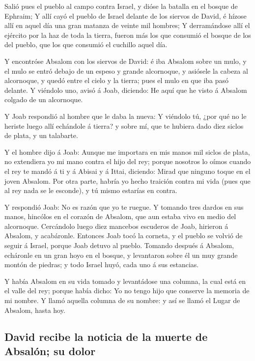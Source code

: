  Salió pues el pueblo al campo contra Israel, y dióse la
batalla en el bosque de Ephraim;  Y allí cayó el pueblo de
Israel delante de los siervos de David, é hízose allí en aquel día una
gran matanza de veinte mil hombres;  Y derramándose allí el
ejército por la haz de toda la tierra, fueron más los que consumió el
bosque de los del pueblo, que los que consumió el cuchillo aquel día.

 Y encontróse Absalom con los siervos de David: é iba
Absalom sobre un mulo, y el mulo se entró debajo de un espeso y grande
alcornoque, y asiósele la cabeza al alcornoque, y quedó entre el cielo y
la tierra; pues el mulo en que iba pasó delante.  Y
viéndolo uno, avisó á Joab, diciendo: He aquí que he visto á Absalom
colgado de un alcornoque.

 Y Joab respondió al hombre que le daba la nueva: Y
viéndolo tú, ¿por qué no le heriste luego allí echándole á tierra? y
sobre mí, que te hubiera dado diez siclos de plata, y un talabarte.

 Y el hombre dijo á Joab: Aunque me importara en mis manos
mil siclos de plata, no extendiera yo mi mano contra el hijo del rey;
porque nosotros lo oímos cuando el rey te mandó á ti y á Abisai y á
Ittai, diciendo: Mirad que ninguno toque en el joven Absalom.
 Por otra parte, habría yo hecho traición contra mi vida
(pues que al rey nada se le esconde), y tú mismo estarías en contra.

 Y respondió Joab: No es razón que yo te ruegue. Y tomando
tres dardos en sus manos, hincólos en el corazón de Absalom, que aun
estaba vivo en medio del alcornoque.  Cercándolo luego diez
mancebos escuderos de Joab, hirieron á Absalom, y acabáronle.
 Entonces Joab tocó la corneta, y el pueblo se volvió de
seguir á Israel, porque Joab detuvo al pueblo.  Tomando
después á Absalom, echáronle en un gran hoyo en el bosque, y levantaron
sobre él un muy grande montón de piedras; y todo Israel huyó, cada uno á
sus estancias.

 Y había Absalom en su vida tomado y levantádose una
columna, la cual está en el valle del rey; porque había dicho: Yo no
tengo hijo que conserve la memoria de mi nombre. Y llamó aquella columna
de su nombre: y así se llamó el Lugar de Absalom, hasta hoy.

\hypertarget{david-recibe-la-noticia-de-la-muerte-de-absaluxf3n-su-dolor}{%
\subsection{David recibe la noticia de la muerte de Absalón; su
dolor}\label{david-recibe-la-noticia-de-la-muerte-de-absaluxf3n-su-dolor}}

